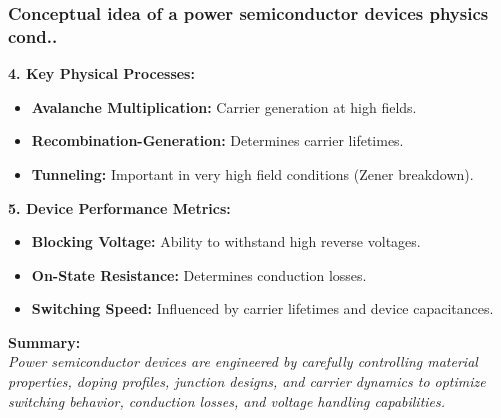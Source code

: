 \begin{frame}
	\frametitle{Conceptual idea of a power semiconductor devices physics cond.. }
\textbf{4. Key Physical Processes:}
\begin{itemize}
    \item \textbf{Avalanche Multiplication:} Carrier generation at high fields.
    \item \textbf{Recombination-Generation:} Determines carrier lifetimes.
    \item \textbf{Tunneling:} Important in very high field conditions (Zener breakdown).
\end{itemize}

\textbf{5. Device Performance Metrics:}
\begin{itemize}
    \item \textbf{Blocking Voltage:} Ability to withstand high reverse voltages.
    \item \textbf{On-State Resistance:} Determines conduction losses.
    \item \textbf{Switching Speed:} Influenced by carrier lifetimes and device capacitances.
\end{itemize}

\textbf{Summary:} \\
\textit{Power semiconductor devices are engineered by carefully controlling material properties, doping profiles, junction designs, and carrier dynamics to optimize switching behavior, conduction losses, and voltage handling capabilities.}
\end{frame}

